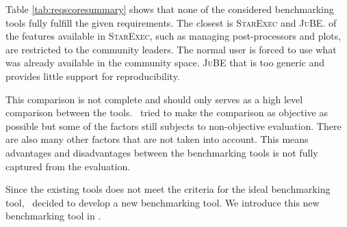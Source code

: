 Table \ref{tab:reqscoresummary} shows that none of the considered benchmarking tools fully fulfill the given requirements.
The closest is \textsc{StarExec} and \textsc{JuBE}.
 of the features available in \textsc{StarExec}, such as managing post-processors and plots, are restricted to the community leaders.
The normal user is forced to use what was already available in the community space.
 \textsc{JuBE} that is too generic and provides little support for reproducibility.

This comparison is not complete and should only serves as a high level comparison between the tools.
\First~tried to make the comparison as objective as possible but some of the factors still subjects to non-objective evaluation.
There are also many other factors that are not taken into account.
This means advantages and disadvantages between the benchmarking tools is not fully captured from the evaluation.

Since the existing tools does not meet the criteria for the ideal benchmarking tool, \first~decided to develop a new benchmarking tool.
We introduce this new benchmarking tool in .


